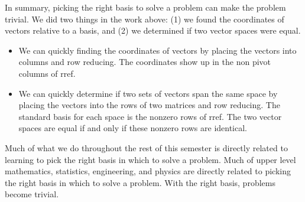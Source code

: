 \begin{enumerate}
\begin{enumerate}
\end{enumerate}

In summary, picking the right basis to solve a problem can make the problem trivial.  We did two things in the work above: (1) we found the coordinates of vectors relative to a basis, and (2) we determined if two vector spaces were equal. 
\begin{itemize}
	\item We can quickly finding the coordinates of vectors by placing the vectors into columns and row reducing. The coordinates show up in the non pivot columns of rref.
	\item We can quickly determine if two sets of vectors span the same space by placing the vectors into the rows of two matrices and row reducing. The standard basis for each space is the nonzero rows of rref. The two vector spaces are equal if and only if these nonzero rows are identical. 
\end{itemize}
Much of what we do throughout the rest of this semester is directly related to learning to pick the right basis in which to solve a problem. Much of upper level mathematics, statistics, engineering, and physics are directly related to picking the right basis in which to solve a problem. With the right basis, problems become trivial.
	
\end{enumerate}


